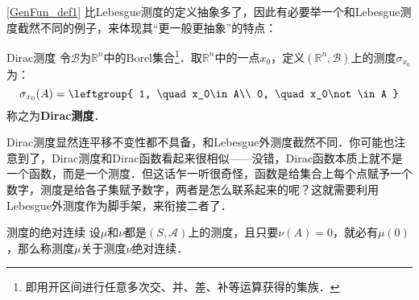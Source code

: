 \autoref{GenFun_def1} 比Lebesgue测度的定义抽象多了，因此有必要举一个和Lebesgue测度截然不同的例子，来体现其“更一般更抽象”的特点：

\begin{example}{Dirac测度}
令$\mathcal{B}$为$\mathbb{R}^n$中的Borel集合\footnote{即用开区间进行任意多次交、并、差、补等运算获得的集族．}．取$\mathbb{R}^n$中的一点$x_0$，定义$(\mathbb{R}^n, \mathcal{B})$上的测度$\sigma_{x_0}$为：
\begin{equation}
\sigma_{x_0}(A)=\leftgroup{
    1, \quad x_0\in A\\
    0, \quad x_0\not\in A
}
\end{equation}
称之为\textbf{Dirac测度}．
\end{example}

Dirac测度显然连平移不变性都不具备，和Lebesgue外测度截然不同．你可能也注意到了，Dirac测度和Dirac函数看起来很相似——没错，Dirac函数本质上就不是一个函数，而是一个测度．但这话乍一听很奇怪，函数是给集合上每个点赋予一个数字，测度是给各子集赋予数字，两者是怎么联系起来的呢？这就需要利用Lebesgue外测度作为脚手架，来衔接二者了．

\begin{definition}{测度的绝对连续}
设$\mu$和$\nu$都是$(S, \mathcal{A})$上的测度，且只要$\nu(A)=0$，就必有$\mu(0)$，那么称测度$\mu$关于测度$\nu$绝对连续．
\end{definition}




















